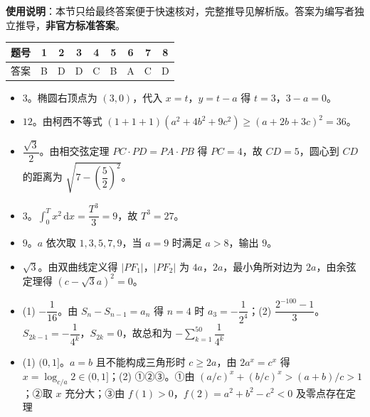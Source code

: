 
\begin{gknotice}
\textbf{使用说明}：本节只给最终答案便于快速核对，完整推导见解析版。答案为编写者独立推导，\textbf{非官方标准答案}。
\end{gknotice}

\begin{center}\begin{tabular}{ccccccccc}
\toprule
题号 & 1 & 2 & 3 & 4 & 5 & 6 & 7 & 8 \\
\midrule
答案 & B & D & D & C & B & A & C & D \\
\bottomrule
\end{tabular}\end{center}

\begin{itemize}[leftmargin=2.6em]
  \item[\textbf{9.}] $3$。椭圆右顶点为 $(3,0)$，代入 $x=t$，$y=t-a$ 得 $t=3$，$3-a=0$。
  \item[\textbf{10.}] $12$。由柯西不等式 $(1+1+1)(a^2+4b^2+9c^2)\geqslant(a+2b+3c)^2=36$。
  \item[\textbf{11.}] $\dfrac{\sqrt3}{2}$。由相交弦定理 $PC\cdot PD=PA\cdot PB$ 得 $PC=4$，故 $CD=5$，圆心到 $CD$ 的距离为 $\sqrt{7-\left(\dfrac52\right)^2}$。
  \item[\textbf{12.}] $3$。$\displaystyle\int_0^T x^2\,\mathrm dx=\dfrac{T^3}{3}=9$，故 $T^3=27$。
  \item[\textbf{13.}] $9$。$a$ 依次取 $1,3,5,7,9$，当 $a=9$ 时满足 $a>8$，输出 $9$。
  \item[\textbf{14.}] $\sqrt3$。由双曲线定义得 $|PF_1|$，$|PF_2|$ 为 $4a$，$2a$，最小角所对边为 $2a$，由余弦定理得 $(c-\sqrt3a)^2=0$。
  \item[\textbf{15.}] (1) $-\dfrac1{16}$。由 $S_n-S_{n-1}=a_n$ 得 $n=4$ 时 $a_3=-\dfrac1{2^4}$；(2) $\dfrac{2^{-100}-1}{3}$。$S_{2k-1}=-\dfrac1{4^k}$，$S_{2k}=0$，故总和为 $-\displaystyle\sum_{k=1}^{50}\dfrac1{4^k}$
  \item[\textbf{16.}] (1) $(0,1]$。$a=b$ 且不能构成三角形时 $c\geqslant2a$，由 $2a^x=c^x$ 得 $x=\log_{c/a}2\in(0,1]$；(2) ①②③。①由 $(a/c)^x+(b/c)^x>(a+b)/c>1$；②取 $x$ 充分大；③由 $f(1)>0$，$f(2)=a^2+b^2-c^2<0$ 及零点存在定理
\end{itemize}

